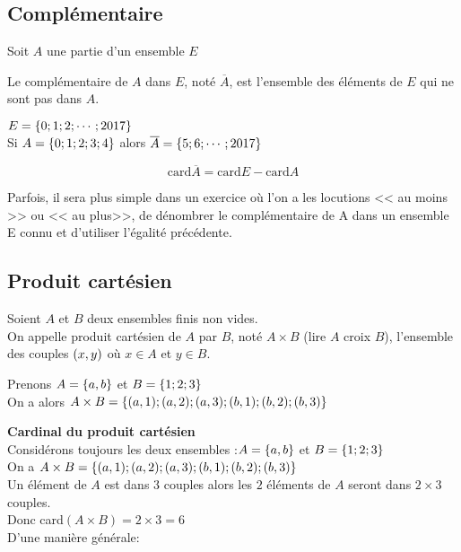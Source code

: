\subsection*{Complémentaire}
Soit  $ A $ une partie d'un ensemble  $ E $
\begin{definition}
 Le  complémentaire de $ A $ dans $ E $,  noté $ \overline{A} $, est l'ensemble des éléments  de $ E $ qui ne sont pas dans $ A. $
 
 \end{definition}
\begin{example}
$ E=\left\{0;1;2; \cdots ; 2017\right\} $\\
Si $ A=\left\{0;1;2;3; 4\right\} $ alors  $ \overline{A}=\left\{5;6;\cdots ;2017\right\} $ 
\end{example}


\begin{property}
\[ \textrm{card} \overline{A} = \textrm{card}E - \textrm{card}A  \]
\end{property}
 Parfois, il sera plus simple dans un exercice où l'on a les locutions << au moins >> ou << au plus>>, de dénombrer le complémentaire de  A dans un ensemble   E connu et d'utiliser l'égalité précédente.

\subsection{Produit cartésien}
\begin{definition}
Soient $A $ et  $B $ deux ensembles finis non vides.\\
On appelle  produit cartésien de $ A$ par $B $, noté $A\times B$  (lire $ A $ croix $ B $), l'ensemble des couples $ \left(x, y\right) $ où $x\in A $ et $y\in B. $
\end{definition}
\begin{example}

Prenons $ A=\left\{a, b\right\} $ et $ B= \left\{1; 2; 3\right\} $\\
On a alors $ A\times B=\left\{(a, 1); (a, 2);(a,3);(b,1);(b,2);(b,3)  \right\} $
\end{example}
\textbf{Cardinal du produit cartésien}\\
Considérons toujours  les deux ensembles :\;$ A=\left\{a, b\right\} $ et $ B= \left\{1; 2; 3\right\} $\\
On a $ A\times B=\left\{(a, 1); (a, 2);(a,3);(b,1);(b,2);(b,3)  \right\} $\\
Un élément de $ A $ est dans $ 3 $ couples alors les $ 2 $ éléments de $ A $ seront dans $ 2\times 3 $ couples.\\  Donc card$( A \times B) = 2\times 3 =6$\\ D'une manière générale:

